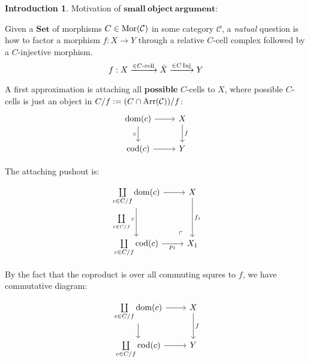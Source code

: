 \documentclass[a4paper]{article}
\theoremstyle{plain}
\theoremstyle{definition}
\newtheorem{intro}[defn]{Introduction}
\theoremstyle{remark}
\newcommand{\mc}[1]{\mathcal{#1}}
\newcommand{\mbf}[1]{\mathbf{#1}}
\newcommand{\mcC}{\mc C}
\DeclareMathOperator{\Mor}{\rm{Mor}}
\DeclareMathOperator{\Inj}{\rm{Inj}}
\DeclareMathOperator{\Arr}{\rm{Arr}}
\DeclareMathOperator{\dom}{dom}
\DeclareMathOperator{\cod}{cod}
\begin{document}
        \begin{intro}
            Motivation of $\mbf{small\ object\ argument}$:
            \par Given a $\mbf{Set}$ of morphisms $C \in \Mor(\mcC)$ in some category $\mcC$,
            a \emph{natual} question is how to factor a morphism $f : X \to Y$ through a relative $C$-cell complex followed by a $C$-injective morphism.
            $$ f : X \xrightarrow{\in C \text{-cell}}  \hat{X} \xrightarrow{\in C \Inj} Y $$

            \par A first approximation is attaching all \textbf{possible} $C$-cells to $X$,
            where possible $C$-cells is just an object in $C/f := (C \cap \Arr(\mcC))/f$:
            \[\begin{tikzcd}
                {\dom(c)} & X \\
                {\cod(c)} & Y
                \arrow["c"', from=1-1, to=2-1]
                \arrow[from=1-1, to=1-2]
                \arrow[from=2-1, to=2-2]
                \arrow["f", from=1-2, to=2-2]
            \end{tikzcd}\]
            
            \par The attaching pushout is:

            \[\begin{tikzcd}[row sep = 1.2cm]
                {\coprod\limits_{c \in C/f} \dom(c)} & X \\
                {\coprod\limits_{c\in C/f} \cod(c)} & X_1
                \arrow["{\coprod\limits_{c\in C/f} c}"', from=1-1, to=2-1]
                \arrow[from=1-1, to=1-2]
                \arrow["p_1"', from=2-1, to=2-2]
                \arrow["f_1", from=1-2, to=2-2]
                \arrow["{\Big \lrcorner}"{anchor=center, pos=0.125, rotate=180}, draw=none, from=2-2, to=1-1]
            \end{tikzcd}\]

            \par By the fact that the coproduct is over all commuting squres to $f$,
            we have commutative diagram:

            \[\begin{tikzcd}
                {{\coprod\limits_{c\in C/f} \dom(c)}} & X \\
                {{\coprod\limits_{c\in C/f} \cod(c)}} & Y
                \arrow[from=1-1, to=2-1]
                \arrow[from=2-1, to=2-2]
                \arrow[from=1-1, to=1-2]
                \arrow["f", from=1-2, to=2-2]
            \end{tikzcd}\]


\end{intro}
\end{document}

